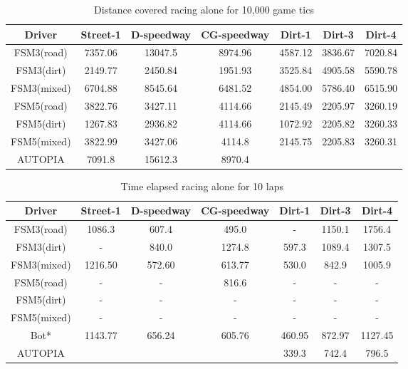 	\begin{table*}[t]
	\renewcommand{\arraystretch}{1.3}
	\caption{Distance covered racing alone for 10,000 game tics}
	\label{tbl:dist covered}
	\centering
	\begin{tabular}{c||c||c||c||c||c||c}
	\hline
	\bfseries Driver & \bfseries Street-1 & \bfseries D-speedway & \bfseries CG-speedway & \bfseries Dirt-1 & \bfseries Dirt-3 & \bfseries Dirt-4 \\ 
	\hline
	\hline FSM3(road) & 7357.06	& 13047.5 & 8974.96 & 4587.12 & 3836.67 & 7020.84 \\
	\hline FSM3(dirt) & 2149.77	& 2450.84 & 1951.93	& 3525.84 & 4905.58 & 5590.78 \\
	\hline FSM3(mixed) & 6704.88 & 8545.64 & 6481.52 & 4854.00 & 5786.40 & 6515.90 \\
	\hline FSM5(road) & 3822.76 & 3427.11 & 4114.66	& 2145.49 &	2205.97 & 3260.19 \\
	\hline FSM5(dirt) & 1267.83 & 2936.82 &	4114.66 & 1072.92 &	2205.82 & 3260.33 \\
	\hline FSM5(mixed) & 3822.99 & 3427.06 & 4114.8 & 2145.75 &	2205.83 & 3260.31 \\
	\hline AUTOPIA & 7091.8 & 15612.3 & 8970.4 & \toDo{?} &\toDo{?} &\toDo{?} \\
	\hline 
	\end{tabular} 
	\end{table*}

	
	\begin{table}[h]
	\renewcommand{\arraystretch}{1.3}
	\caption{Time elapsed racing alone for 10 laps}
	\label{tbl:time raced}
	\centering
	\begin{tabular}{c||c||c||c||c||c||c}
	\hline
	\bfseries Driver & \bfseries Street-1 & \bfseries D-speedway & \bfseries CG-speedway & \bfseries Dirt-1 & \bfseries Dirt-3 & \bfseries Dirt-4 \\ 
	\hline
	\hline FSM3(road) & 1086.3 & 607.4 & 495.0 & - & 1150.1 & 1756.4 \\
	\hline FSM3(dirt) & - & 840.0 & 1274.8 & 597.3 & 1089.4 & 1307.5 \\
	\hline FSM3(mixed) & 1216.50 & 572.60 & 613.77& 530.0 & 842.9 & 1005.9 \\
	\hline FSM5(road) & - & - & 816.6 & - &	- & - \\
	\hline FSM5(dirt) & - & - & - & - &	- & - \\
	\hline FSM5(mixed) & - & - & - & - & - & - \\
	\hline Bot* & 1143.77 & 656.24 & 605.76 & 460.95 & 872.97 & 1127.45 \\
	\hline AUTOPIA & \toDo{?} & \toDo{?} & \toDo{?} & 339.3 & 742.4 & 796.5 \\
	\hline 
	\end{tabular} 
	\end{table}
	
